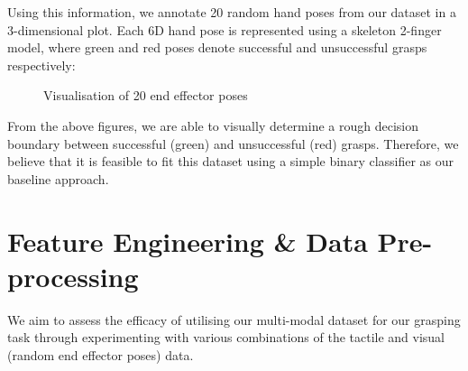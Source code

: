 \documentclass[12pt, a4paper]{report}
\theoremstyle{definition}
\begin{document}
\noindent Using this information, we annotate 20 random hand poses from our dataset in a 3-dimensional plot. Each 6D hand pose is represented using a skeleton 2-finger model, where green and red poses denote successful and unsuccessful grasps respectively:
\begin{figure}[H]%
    \centering
    \qquad
    \caption{Visualisation of 20 end effector poses}%
    \label{fig:4.4}%
\end{figure}
\noindent From the above figures, we are able to visually determine a rough decision boundary between successful (green) and unsuccessful (red) grasps. Therefore, we believe that it is feasible to fit this dataset using a simple binary classifier as our baseline approach.


\section{Feature Engineering \& Data Pre-processing}
\label{sec:4.4}
We aim to assess the efficacy of utilising our multi-modal dataset for our grasping task through experimenting with various combinations of the tactile and visual (random end effector poses) data.
\end{document}
